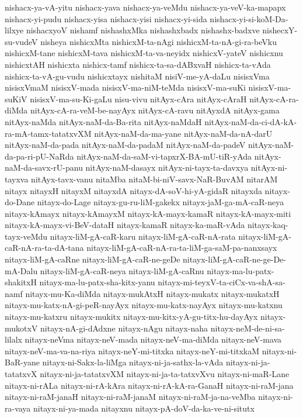 {nishacx-ya-vA-yitu
nishacx-yava
nishacx-ya-veMdu
nishacx-ya-veV-ka-mapapx
nishacx-yi-pudu
nishacx-yisa
nishacx-yisi
nishacx-yi-sida
nishacx-yi-si-koM-Da-lilxye
nishacxyoV
nishamf
nishashxMka
nishashxbadx
nishashx-badxve
nishecxY-su-vudeV
nisheya
nishicxMta
nishicxM-ta-nAgi
nishicxM-ta-nA-gi-ra-beVku
nishicxM-tane
nishicxM-tava
nishicxM-ta-va-neyidx
nishicxV-yateV
nishicxnu
nishicxtAH
nishicxta
nishicx-tamf
nishicx-ta-sa-dABxvaH
nishicx-ta-vAda
nishicx-ta-vA-gu-vudu
nishicxtayx
nishitaM
nisiV-me-yA-daLu
nisisxVma
nisisxVmaM
nisisxV-mada
nisisxV-ma-niM-teMda
nisisxV-ma-suKi
nisisxV-ma-suKiV
nisisxV-ma-su-Ki-gaLu
nisu-vivu
nitAyx-cAra
nitAyx-cAraH
nitAyx-cA-ra-diMda
nitAyx-cA-ra-veM-be-nayAyx
nitAyx-cA-ravu
nitAyxdA
nitAyx-gama
nitAyx-naMda
nitAyx-naM-da-Ba-rita
nitAyx-naMdaH
nitAyx-naM-da-ci-dA-kA-ra-mA-tamx-tatatxvXM
nitAyx-naM-da-ma-yane
nitAyx-naM-da-nA-darU
nitAyx-naM-da-pada
nitAyx-naM-da-padaM
nitAyx-naM-da-padeV
nitAyx-naM-da-pa-ri-pU-NaRda
nitAyx-naM-da-saM-vi-tapxrX-BA-mU-tiR-yAda
nitAyx-naM-da-savx-rU-panu
nitAyx-naM-dasayx
nitAyx-ni-tayx-ta-davxya
nitAyx-ni-tayxva
nitAyx-tavx-vanu
nitaMba
nitaM-bi-niV-savx-NaR-BuvAM
nitarAM
nitayx
nitayxH
nitayxM
nitayxdA
nitayx-dA-soV-hi-yA-gidaR
nitayxda
nitayx-do-Dane
nitayx-do-Lage
nitayx-gu-ru-liM-gakekx
nitayx-jaM-ga-mA-caR-neya
nitayx-kAmayx
nitayx-kAmayxM
nitayx-kA-mayx-kamaR
nitayx-kA-mayx-miti
nitayx-kA-mayx-vi-BeV-dataH
nitayx-kamaR
nitayx-ka-maR-vAda
nitayx-kaq-tayx-veMdu
nitayx-liM-gA-caR-karu
nitayx-liM-gA-caR-nA-rata
nitayx-liM-gA-caR-nA-ra-ta-dA-tana
nitayx-liM-gA-caR-nA-ra-ta-liM-ga-saM-pa-nanxsayx
nitayx-liM-gA-caRne
nitayx-liM-gA-caR-ne-geDe
nitayx-liM-gA-caR-ne-ge-De-mA-Dalu
nitayx-liM-gA-caR-neya
nitayx-liM-gA-caRnu
nitayx-ma-lu-patx-shakitxH
nitayx-ma-lu-patx-sha-kitx-yanu
nitayx-mi-teyxV-ta-ciCx-va-shA-sa-namf
nitayx-mu-Ka-diMda
nitayx-mukAtxH
nitayx-mukatx
nitayx-mukatxH
nitayx-mu-katx-nA-gi-peR-nayAyx
nitayx-mu-katx-nayAyx
nitayx-mu-katxnu
nitayx-mu-katxru
nitayx-mukitx
nitayx-mu-kitx-yA-gu-titx-hu-dayAyx
nitayx-mukotxV
nitayx-nA-gi-dAdxne
nitayx-nAgu
nitayx-naha
nitayx-neM-de-ni-sa-lilalx
nitayx-neVma
nitayx-neV-mada
nitayx-neV-ma-diMda
nitayx-neV-mava
nitayx-neV-ma-va-na-riya
nitayx-neY-mi-titxka
nitayx-neY-mi-titxkaM
nitayx-ni-BaR-yane
nitayx-ni-Sakx-la-liMga
nitayx-ni-ja-sathx-la-vAda
nitayx-ni-ja-tatatxvX
nitayx-ni-ja-tatatxvXM
nitayx-ni-ja-ta-tatxvXvu
nitayx-ni-maR-Lane
nitayx-ni-rALa
nitayx-ni-rA-kAra
nitayx-ni-rA-kA-ra-GanaH
nitayx-ni-raM-jana
nitayx-ni-raM-janaH
nitayx-ni-raM-janaM
nitayx-ni-raM-ja-na-veMba
nitayx-ni-ra-vaya
nitayx-ni-ya-mada
nitayxnu
nitayx-pA-doV-da-ka-ve-ni-situtx
}
